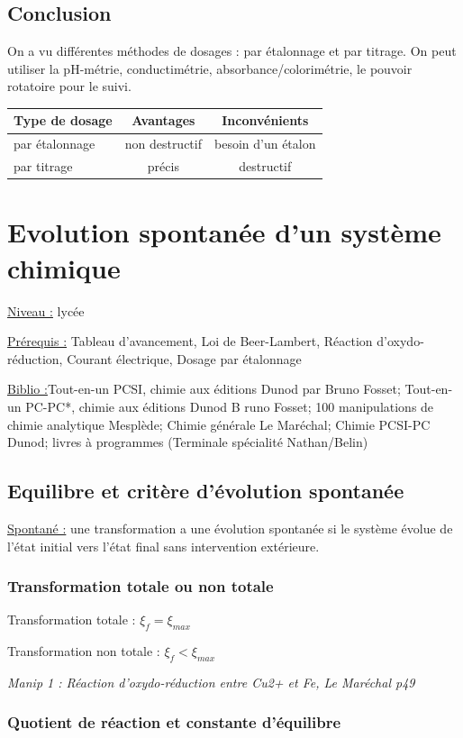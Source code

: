 \documentclass{article}%
\begin{document}
\subsection{Conclusion}

On a vu différentes méthodes de dosages : par étalonnage et par titrage. On peut utiliser la pH-métrie, conductimétrie, absorbance/colorimétrie, le pouvoir rotatoire pour le suivi.

\begin{tabular}{l|cc}
Type de dosage &Avantages &Inconvénients \\
\hline
par étalonnage &non destructif & besoin d'un étalon \\
par titrage &précis &destructif\\
\hline
\end{tabular}
\section{Evolution spontanée d'un système chimique}
\underline{Niveau :} lycée

\underline{Prérequis :} Tableau d’avancement, Loi de Beer-Lambert, Réaction d’oxydo-réduction, Courant électrique, Dosage par étalonnage

\underline{Biblio :}Tout-en-un PCSI, chimie aux éditions Dunod par Bruno Fosset; Tout-en-un PC-PC*, chimie aux éditions Dunod B    runo Fosset; 100 manipulations de chimie analytique Mesplède; Chimie générale Le Maréchal; Chimie PCSI-PC Dunod; livres à programmes (Terminale spécialité Nathan/Belin)
 
\subsection{Equilibre et critère d'évolution spontanée}
\underline{Spontané :} une transformation a une évolution spontanée si le système évolue de l’état initial vers
l’état final sans intervention extérieure.


\subsubsection{Transformation totale ou non totale}

Transformation totale : $\xi_f = \xi_{max}$

Transformation non totale : $\xi_f < \xi_{max}$

\textit{Manip 1 : Réaction d’oxydo-réduction entre Cu2+ et Fe, Le Maréchal p49}
\subsubsection{Quotient de réaction et constante d'équilibre}
\end{document}
